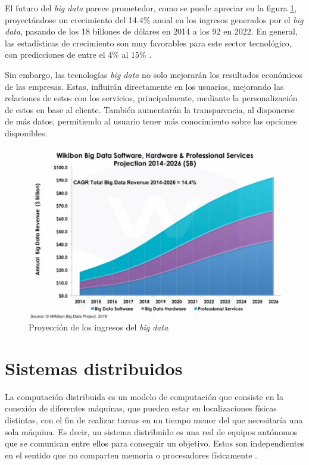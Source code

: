 El futuro del \textit{big data} parece prometedor, como se puede apreciar en la figura \ref{forecast}, proyectándose un crecimiento del 14.4\% anual en los ingresos generados por el \textit{big data}, pasando de los 18 billones de dólares en 2014 a los 92 en 2022. En general, las estadísticas de crecimiento son muy favorables para este sector tecnológico, con predicciones de entre el 4\% al 15\% \cite{forecast}.

Sin embargo, las tecnologías \textit{big data} no solo mejorarán los resultados económicos de las empresas. Estas, influirán directamente en los usuarios, mejorando las relaciones de estos con los servicios, principalmente, mediante la personalización de estos en base al cliente. También aumentarán la transparencia, al disponerse de más datos, permitiendo al usuario tener más conocimiento sobre las opciones disponibles.

\begin{figure}[htp!]
	\centering
	\caption{Proyección de los ingresos del \textit{big data}  \cite{forecast}}
	\label{forecast}
	\vspace{5pt}
	\includegraphics[scale=0.5]{graphics/forecast}
\end{figure}

\section{Sistemas distribuidos}
La computación distribuida es un modelo de computación que consiste en la conexión de diferentes máquinas, que pueden estar en localizaciones físicas distintas, con el fin de realizar tareas en un tiempo menor del que necesitaría una sola máquina. Es decir, un sistema distribuido es una red de equipos autónomos que se comunican entre ellos para conseguir un objetivo. Estos son independientes en el sentido que no comparten memoria o procesadores físicamente \cite{computacionDistribuidad}.

